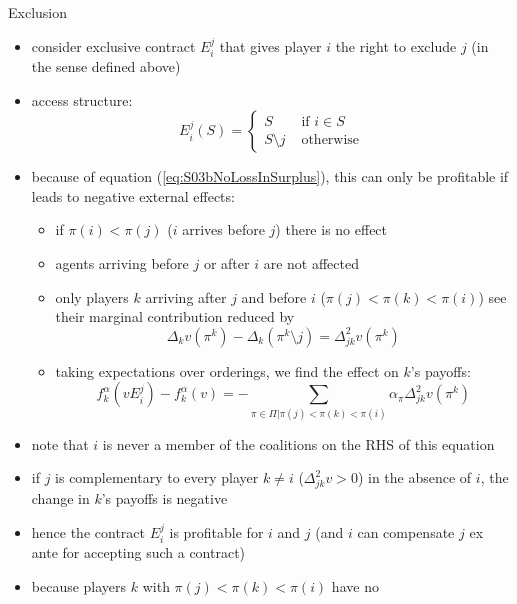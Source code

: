 \documentclass[11pt,english]{beamer}
\begin{document}
\begin{frame}[allowframebreaks]{Exclusion}
  \begin{itemize}
  \item consider exclusive contract $E_i^j$ that gives player $i$ the
    right to exclude $j$ (in the sense defined above)
  \item access structure:
    \begin{equation*}
      E_i^j(S) =
      \begin{cases}
        S &\text{ if } i \in S \\
        S\setminus j &\text{ otherwise}
      \end{cases}
    \end{equation*}
  \item because of equation (\ref{eq:S03bNoLossInSurplus}), this can
    only be profitable if leads to negative external effects:
    \begin{itemize}
    \item if $\pi(i) < \pi(j)$ ($i$ arrives before $j$) there is no effect
    \item agents arriving before $j$ or after $i$ are not affected
    \item only players $k$ arriving after $j$ and before $i$
      ($\pi(j)<\pi(k)<\pi(i)$) see their marginal contribution reduced by
      \begin{equation*}
        \Delta_k v(\pi^k)-\Delta_k(\pi^k\setminus j) = \Delta^2_{jk} v(\pi^k)
      \end{equation*}
    \item taking expectations over orderings, we find the effect on
      $k$'s payoffs:
      \begin{equation} \label{eq:S03bExclusionProfitable}
        f_k^\alpha(vE_i^j)-f_k^\alpha(v) = -\sum_{\pi \in
          \Pi|\pi(j)<\pi(k)<\pi(i)} \alpha_\pi \Delta^2_{jk} v(\pi^k)
      \end{equation}
    \end{itemize}
  \item note that $i$ is never a member of the coalitions on the RHS
      of this equation
    \item if $j$ is complementary to every player $k \neq i$ ($\Delta^2_{jk}v>0$) in the
      absence of $i$, the change in $k$'s payoffs is negative
    \item hence the contract $E_i^j$ is profitable for $i$ and $j$
      (and $i$ can compensate $j$ ex ante for accepting such a contract)
    \item because players $k$ with $\pi(j)<\pi(k)<\pi(i)$ have no

\end{itemize}
\end{frame}
\end{document}
